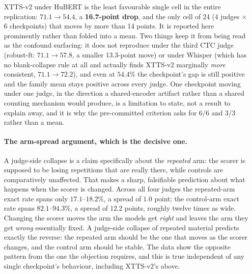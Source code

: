 \documentclass[11pt]{article}
\begin{document}
\noindent XTTS-v2 under HuBERT is the least favourable single cell in the
entire replication: $71.1\to54.4$, a \textbf{16.7-point drop}, and the only
cell of 24 (4 judges $\times$ 6 checkpoints) that moves by more than 14
points. It is reported here prominently rather than folded into a mean. Two
things keep it from being read as the confound surfacing: it does not
reproduce under the third CTC judge (robust-ft: $71.1\to57.8$, a smaller
13.3-point move) or under Whisper (which has no blank-collapse rule at all
and actually finds XTTS-v2 marginally \emph{more} consistent, $71.1\to72.2$),
and even at $54.4\%$ the checkpoint's gap is still positive and the family
mean stays positive across every judge. One checkpoint moving under one
judge, in the direction a shared-encoder artifact rather than a shared
counting mechanism would produce, is a limitation to state, not a result to
explain away, and it is why the pre-committed criterion asks for 6/6 and 3/3
rather than a mean.

\paragraph{The arm-spread argument, which is the decisive one.} A judge-side
collapse is a claim specifically about the \emph{repeated} arm: the scorer is
supposed to be losing repetitions that are really there, while controls are
comparatively unaffected. That makes a sharp, falsifiable prediction about
what happens when the scorer is changed. Across all four judges the
repeated-arm exact rate spans only $17.1$--$18.2\%$, a spread of $1.0$ point;
the control-arm exact rate spans $82.1$--$94.3\%$, a spread of $12.2$
points, roughly twelve times as wide. Changing the scorer moves the arm the models
get \emph{right} and leaves the arm they get \emph{wrong} essentially fixed.
A judge-side collapse of repeated material predicts exactly the reverse: the
repeated arm should be the one that moves as the scorer changes, and the
control arm should be stable. The data show the opposite pattern from the one
the objection requires, and this is true independent of any single
checkpoint's behaviour, including XTTS-v2's above.
\end{document}
